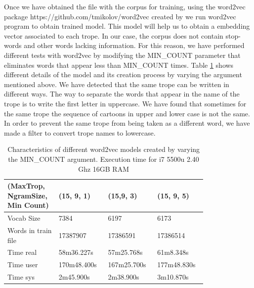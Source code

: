 \documentclass[letterpaper]{article}
\begin{document}
	Once we have obtained the file with the corpus for training, using the word2vec package https://github.com/tmikolov/word2vec created by
	\cite{mikolov2013} we run word2vec program to obtain trained model. This model will help us to obtain a embedding vector associated to each trope.
	In our case, the corpus does not contain stop-words and other words lacking information. For this reason, we have performed different tests with
	word2vec by modifying the MIN\_COUNT parameter that eliminates words that appear less than MIN\_COUNT times. Table \ref{tab:variations-with-min-count-argument-15-9}
	shows different details of the model and its creation process by varying the argument mentioned above.
	We have detected that the same trope can be written in different ways. The way to separate the words that appear in the name of the trope is to write
	the first letter in uppercase. We have found that sometimes for the same trope the sequence of cartoons in upper and lower case is not the same. 
	In order to prevent the same trope from being taken as a different word, we have made a filter to convert trope names to lowercase.
	
	
	\begin{table}[t]
		\centering
		\begin{tabular}{|p{0.20\linewidth}|p{0.2\linewidth}|p{0.2\linewidth}|p{0.2\linewidth}|}
			\hline
			\textbf{(MaxTrop, NgramSize, Min Count)}& \textbf{(15, 9, 1)} & \textbf{(15,9, 3)} & \textbf{(15, 9, 5)}\\
			\hline
			\hline
			Vocab Size& 7384 & 6197 & 6173 \\
			\hline
			Words in train file& 17387907 & 17386591 & 17386514 \\
			\hline
			Time real&58m36.227s&57m25.768s&61m8.348s\\
			\hline
			Time user&170m48.400s&167m25.700s&177m48.830s\\
			\hline
			Time sys&2m45.900s&2m38.900s&3m10.870s\\
			\hline
			
		\end{tabular}
		\caption{Characteristics of different word2vec models created by varying the MIN\_COUNT argument. Execution time for i7 5500u 2.40 Ghz 16GB RAM}
		\label{tab:variations-with-min-count-argument-15-9}
	\end{table}	
	
\end{document}
